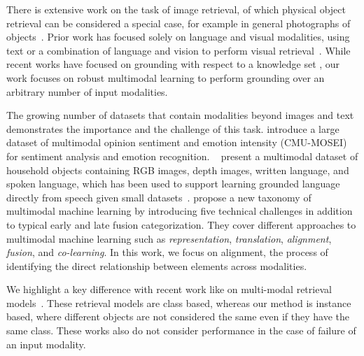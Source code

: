 \documentclass[sigconf,natbib=true,anonymous=true]{acmart}
\newcommand{\todocmi}[1]{\todo[inline,color=green!40]{\small #1 -- Cynthia}}
\begin{document}

There is extensive work on the task of image retrieval, of which physical object retrieval can be considered a special case, for example in
general photographs of objects~\citep{ma2020large, novak2015large, hong2021gilbert}. Prior work has focused solely on language and visual modalities, using text or a combination of language and vision to perform visual retrieval~\citep{vo2019composing}. While recent works have focused on grounding with respect to a knowledge set \citep{10.1145/3357384.3357889,10.1145/3397271.3401097}, our work focuses on robust multimodal learning to perform grounding over an arbitrary number of input modalities. 

The growing number of datasets that contain modalities beyond images and text demonstrates the importance and the challenge of this task. \citet{bagher-zadeh-etal-2018-multimodal} introduce a large dataset of multimodal opinion sentiment and emotion intensity (CMU-MOSEI) for sentiment analysis and emotion recognition. 
~\citet{GoLD_UMBC} present a multimodal dataset of household objects containing RGB images, depth images, written language, and spoken language, which has been used to support learning grounded language directly from speech given small datasets~\citep{KebeAAAI2022}. 
\citet{baltrusaitisMultimodalMachineLearning2019} propose a new taxonomy of multimodal machine learning by introducing five technical challenges in addition to typical early and late fusion categorization. They cover different approaches to multimodal machine learning such as \textit{representation}, \textit{translation}, \textit{alignment}, \textit{fusion}, and \textit{co-learning}. In this work, we focus on alignment, the process of identifying the direct relationship between elements across modalities.

We highlight a key difference with recent work like on multi-modal retrieval models~\cite{10.1145/3397271.3401232, 10.1145/3331184.3331213}. These retrieval models are class based, whereas our method is instance based, where different objects are not considered the same even if they have the same class. These works also do not consider performance in the case of failure of an input modality. 
\end{document}
